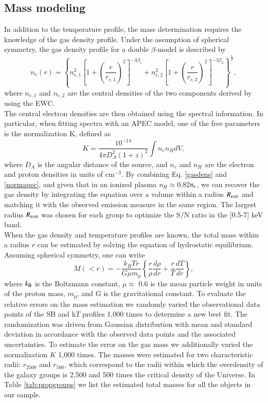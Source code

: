 \documentclass{aa} %
\begin{document}
\subsection{Mass modeling}
In addition to the temperature profile, the mass determination requires the
knowledge of the gas density profile. Under the assumption of
spherical symmetry, the gas density profile for a double $\beta$-model
is described by
\begin{equation}\label{gasdens}
n_e(r)=\left\{n_{e,1}^2\left[1+\left(\frac{r}{r_{c,1}}\right)^2\right]^{-3\beta_1}+n_{e,2}^2\left[1+\left(\frac{r}{r_{c,2}}\right)^2\right]^{-3\beta_2}\right\}^{\frac{1}{2}},
\end{equation}
where $n_{e,1}$ and $n_{e,2}$ are the central densities of the two components derived by using the EWC. \\
The central electron densities are then obtained using the spectral
information. In particular, when fitting spectra with an APEC model,
one of the free parameters is the normalization K, defined as
\begin{equation}\label{normapec}
K=\frac{10^{-14}}{4\pi D_A^2 (1+z)^2}\int{n_en_HdV},
\end{equation}
where $D_A$ is the angular distance of the source, and $n_e$ and $n_H$ are
the electron and proton densities in units of cm$^{-3}$. By combining Eq. \ref{gasdens} and \ref{normapec}, and
given that in an ionized plasma {\it n$_H$}$\approx$0.82${\it n_e}$, we
can recover the gas density by integrating the equation over a volume
within a radius $R_{\rm extr}$ and matching it with the observed
emission measure in the same region. The largest radius $R_{\rm extr}$
was chosen for each group to
optimize the S/N ratio in the [0.5-7] keV band.\\
When the gas density and temperature profiles are known, the total mass
within a radius $r$ can be estimated by solving the equation of
hydrostatic equilibrium. Assuming spherical symmetry, one can write
\begin{equation}
M(<r)=-\frac{k_BTr}{G\mu m_p}\left\{ \frac{r}{\rho} \frac{d\rho}{dr} + \frac{r}{T} \frac{dT}{dr} \right\},
\end{equation}
where $k_{\rm B}$ is the Boltzmann constant, $\mu\approx$ 0.6 is the mean
particle weight in units of the proton mass, $m_{\text{p}}$, and G is the
gravitational constant. To evaluate the relative errors on the mass estimation we randomly varied 
the observational data points of the SB and k$T$ profiles 1,000 times to determine a new best fit. The randomization was
driven from Gaussian distribution with mean and standard deviation in
accordance with the observed data points and the associated uncertainties. To estimate the error on the gas mass we additionally varied the normalization $K$ 1,000 times. The masses were estimated
for two characteristic radii: $r_{\text{2500}}$ and $r_{\text{500}}$, which correspond to the radii within which the overdensity of the galaxy groups is 2,500 and 500 times the critical density of the Universe.  In Table \ref{tab:propgroups} we list the estimated total masses for all the objects in our sample.
\end{document}
